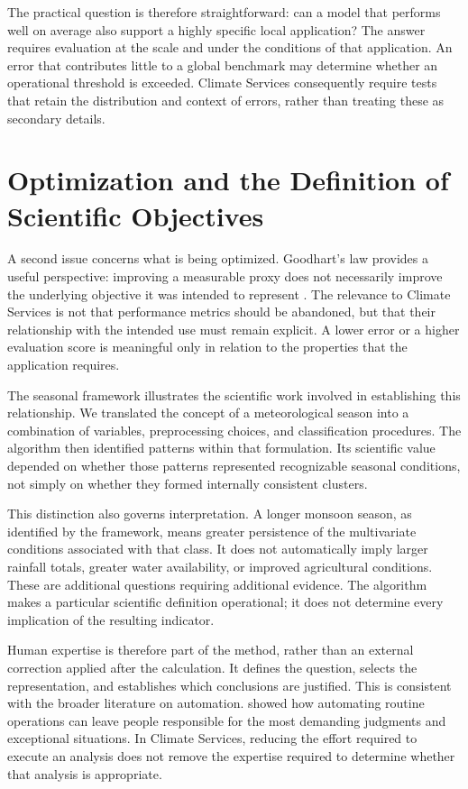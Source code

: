 The practical question is therefore straightforward: can a model that performs well on average also support a highly specific local application? The answer requires evaluation at the scale and under the conditions of that application. An error that contributes little to a global benchmark may determine whether an operational threshold is exceeded. Climate Services consequently require tests that retain the distribution and context of errors, rather than treating these as secondary details.

\section{Optimization and the Definition of Scientific Objectives}

A second issue concerns what is being optimized. Goodhart's law provides a useful perspective: improving a measurable proxy does not necessarily improve the underlying objective it was intended to represent \citep{manheim_categorizing_2018}. The relevance to Climate Services is not that performance metrics should be abandoned, but that their relationship with the intended use must remain explicit. A lower error or a higher evaluation score is meaningful only in relation to the properties that the application requires.

The seasonal framework illustrates the scientific work involved in establishing this relationship. We translated the concept of a meteorological season into a combination of variables, preprocessing choices, and classification procedures. The algorithm then identified patterns within that formulation. Its scientific value depended on whether those patterns represented recognizable seasonal conditions, not simply on whether they formed internally consistent clusters.

This distinction also governs interpretation. A longer monsoon season, as identified by the framework, means greater persistence of the multivariate conditions associated with that class. It does not automatically imply larger rainfall totals, greater water availability, or improved agricultural conditions. These are additional questions requiring additional evidence. The algorithm makes a particular scientific definition operational; it does not determine every implication of the resulting indicator.

Human expertise is therefore part of the method, rather than an external correction applied after the calculation. It defines the question, selects the representation, and establishes which conclusions are justified. This is consistent with the broader literature on automation. \citet{bainbridge_ironies_1983} showed how automating routine operations can leave people responsible for the most demanding judgments and exceptional situations. In Climate Services, reducing the effort required to execute an analysis does not remove the expertise required to determine whether that analysis is appropriate.

